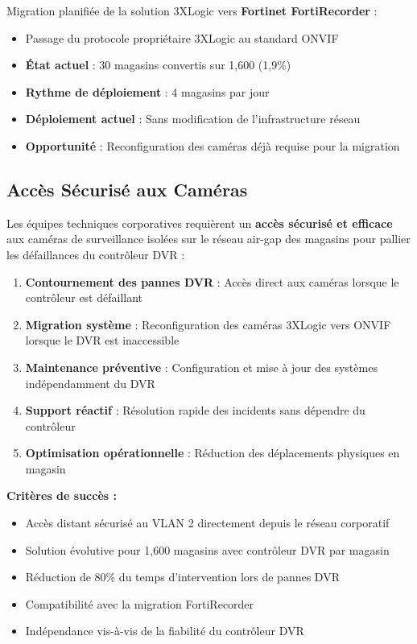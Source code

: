 \documentclass{UTT-Books-44}
\begin{document}
Migration planifiée de la solution 3XLogic vers \textbf{Fortinet FortiRecorder} :
\begin{itemize}
\item Passage du protocole propriétaire 3XLogic au standard ONVIF
\item \textbf{État actuel} : 30 magasins convertis sur 1,600 (1,9\%)
\item \textbf{Rythme de déploiement} : 4 magasins par jour
\item \textbf{Déploiement actuel} : Sans modification de l'infrastructure réseau
\item \textbf{Opportunité} : Reconfiguration des caméras déjà requise pour la migration
\end{itemize}


\subsection{Accès Sécurisé aux Caméras}

Les équipes techniques corporatives requièrent un \textbf{accès sécurisé et efficace} aux caméras de surveillance isolées sur le réseau air-gap des magasins pour pallier les défaillances du contrôleur DVR :

\begin{enumerate}
\item \textbf{Contournement des pannes DVR} : Accès direct aux caméras lorsque le contrôleur est défaillant
\item \textbf{Migration système} : Reconfiguration des caméras 3XLogic vers ONVIF lorsque le DVR est inaccessible
\item \textbf{Maintenance préventive} : Configuration et mise à jour des systèmes indépendamment du DVR
\item \textbf{Support réactif} : Résolution rapide des incidents sans dépendre du contrôleur
\item \textbf{Optimisation opérationnelle} : Réduction des déplacements physiques en magasin
\end{enumerate}

\noindent\textbf{Critères de succès :}
\begin{itemize}
\item Accès distant sécurisé au VLAN 2 directement depuis le réseau corporatif
\item Solution évolutive pour 1,600 magasins avec contrôleur DVR par magasin
\item Réduction de 80\% du temps d'intervention lors de pannes DVR
\item Compatibilité avec la migration FortiRecorder
\item Indépendance vis-à-vis de la fiabilité du contrôleur DVR
\end{itemize}
\end{document}
